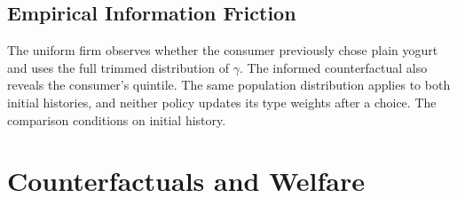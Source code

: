 \documentclass[12pt]{article}
\theoremstyle{definition}
\theoremstyle{remark}
\begin{document}

\subsection{Empirical Information Friction}
\label{subsec:empirical-information}
The uniform firm observes whether the consumer previously chose plain
yogurt and uses the full trimmed distribution of $\gamma$. The informed
counterfactual also reveals the consumer's quintile. The same population
distribution applies to both initial histories, and neither policy updates
its type weights after a choice. The comparison conditions on initial history.


\section{Counterfactuals and Welfare}
\label{sec:counterfactuals}
\end{document}
